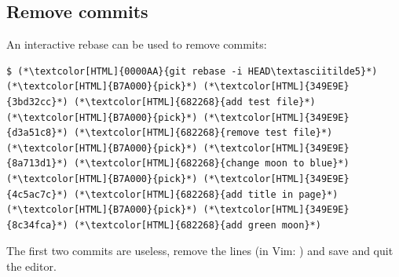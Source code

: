 \subsection{Remove commits}
\begin{frame}[fragile]
  \subslidetitle
  An interactive rebase can be used to remove commits:
  \begin{lstlisting}
$ (*\textcolor[HTML]{0000AA}{git rebase -i HEAD\textasciitilde5}*)
(*\textcolor[HTML]{B7A000}{pick}*) (*\textcolor[HTML]{349E9E}{3bd32cc}*) (*\textcolor[HTML]{682268}{add test file}*)
(*\textcolor[HTML]{B7A000}{pick}*) (*\textcolor[HTML]{349E9E}{d3a51c8}*) (*\textcolor[HTML]{682268}{remove test file}*)
(*\textcolor[HTML]{B7A000}{pick}*) (*\textcolor[HTML]{349E9E}{8a713d1}*) (*\textcolor[HTML]{682268}{change moon to blue}*)
(*\textcolor[HTML]{B7A000}{pick}*) (*\textcolor[HTML]{349E9E}{4c5ac7c}*) (*\textcolor[HTML]{682268}{add title in page}*)
(*\textcolor[HTML]{B7A000}{pick}*) (*\textcolor[HTML]{349E9E}{8c34fca}*) (*\textcolor[HTML]{682268}{add green moon}*)
\end{lstlisting}
  The first two commits are useless, remove the lines (in Vim: ) and save and quit the editor.

\end{frame}

